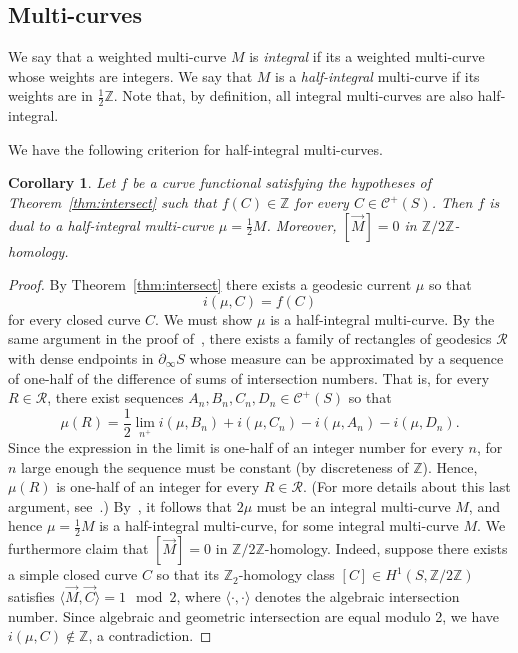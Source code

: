\documentclass[11pt]{amsart}
\numberwithin{equation}{section}
\numberwithin{figure}{section}
\newtheorem{corollary}[theorem]{Corollary}
\theoremstyle{definition}
\theoremstyle{plain}
\newcommand{\Curves}{\mathcal{C}}
\begin{document}
\subsection{Multi-curves}

We say that a weighted multi-curve $M$ is \emph{integral}
 if its a weighted multi-curve whose weights are integers. We say that $M$ is a \emph{half-integral} multi-curve if its weights are in $\frac{1}{2}\mathbb{Z}$. Note that, by definition, all integral multi-curves are also half-integral.

We have the following criterion for half-integral multi-curves.

\begin{corollary}
Let $f$ be a curve functional satisfying the hypotheses of Theorem~\ref{thm:intersect}  such that $f(C) \in \mathbb{Z}$ for every $C \in \Curves^+(S)$. Then $f$ is dual to a half-integral multi-curve $\mu=\frac{1}{2}M$.
Moreover, $[\vec{M}] = 0$ in $\mathbb{Z}/2\mathbb{Z}$-homology.
\label{cor:int_multicurve}
\end{corollary}
\begin{proof}
By Theorem~\ref{thm:intersect} there exists a geodesic current $\mu$ so that
\[
i(\mu, C) = f(C)
\]
for every closed curve $C$.
We must show $\mu$ is a half-integral multi-curve. By the same argument in the proof of~\cite[Th\'eor\`eme~1]{Otal90:SpectreMarqueNegative}, there exists a family of rectangles of geodesics $\mathcal{R}$ with dense endpoints in $\partial_{\infty} S$ whose measure can be approximated by a sequence of one-half of the difference of sums of intersection numbers. That is, for every $R \in \mathcal{R}$, there exist sequences $A_n, B_n, C_n, D_n \in \Curves^+(S)$ so that
\[
\mu(R) = \frac{1}{2}\lim_{n^+} i(\mu, B_n) + i(\mu, C_n) - i(\mu, A_n) - i(\mu, D_n).
\]
Since the expression in the limit is one-half of an integer number for every $n$, for $n$ large enough the sequence must be constant (by discreteness of $\mathbb{Z}$). 
Hence, $\mu(R)$ is one-half of an integer for every $R \in \mathcal{R}$. (For more details about this last argument, see~\cite{Jyothis2025IvanovMeta}.)
By~\cite[Proposition~4.12]{BIPP24:PositiveCrossratios}, it follows that $2\mu$ must be an integral multi-curve $M$, and hence $\mu=\frac{1}{2} M$ is a half-integral multi-curve, for some integral multi-curve $M$.
We furthermore claim that $[\vec{M}]=0$ in $\mathbb{Z}/2\mathbb{Z}$-homology. 
Indeed, suppose there exists a simple closed curve $C$ so that its $\mathbb{Z}_2$-homology class
$[C] \in H^1(S,\mathbb{Z}/2\mathbb{Z})$ satisfies $\langle \vec M,\vec C\rangle=1 \mod 2$, where $\langle \cdot, \cdot \rangle$ denotes the algebraic intersection number. Since algebraic and geometric intersection are equal modulo 2, we have $i(\mu, C) \notin \mathbb{Z}$, a contradiction.
\end{proof}
\end{document}
